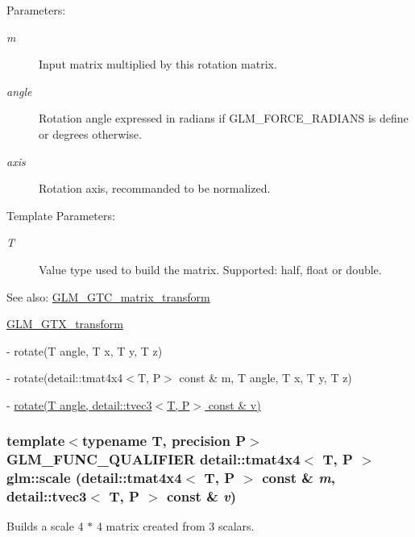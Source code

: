 \begin{Desc}
\item[Parameters:]
\begin{description}
\item[{\em m}]Input matrix multiplied by this rotation matrix. \item[{\em angle}]Rotation angle expressed in radians if GLM\_\-FORCE\_\-RADIANS is define or degrees otherwise. \item[{\em axis}]Rotation axis, recommanded to be normalized. \end{description}
\end{Desc}
\begin{Desc}
\item[Template Parameters:]
\begin{description}
\item[{\em T}]Value type used to build the matrix. Supported: half, float or double. \end{description}
\end{Desc}
\begin{Desc}
\item[See also:]\hyperlink{group__gtc__matrix__transform}{GLM\_\-GTC\_\-matrix\_\-transform} 

\hyperlink{group__gtx__transform}{GLM\_\-GTX\_\-transform} 

- rotate(T angle, T x, T y, T z) 

- rotate(detail::tmat4x4$<$T, P$>$ const \& m, T angle, T x, T y, T z) 

- \hyperlink{group__gtx__transform_g52e753e0ad1cb6ae700855cc9ca921ca}{rotate(T angle, detail::tvec3$<$T, P$>$ const \& v)} \end{Desc}
\hypertarget{group__gtc__matrix__transform_g5e2bf1cdf124863558884751d611aea6}{
\subsubsection[scale]{\setlength{\rightskip}{0pt plus 5cm}template$<$typename T, precision P$>$ GLM\_\-FUNC\_\-QUALIFIER detail::tmat4x4$<$ T, P $>$ glm::scale (detail::tmat4x4$<$ T, P $>$ const \& {\em m}, \/  detail::tvec3$<$ T, P $>$ const \& {\em v})}}
\label{group__gtc__matrix__transform_g5e2bf1cdf124863558884751d611aea6}


Builds a scale 4 $\ast$ 4 matrix created from 3 scalars.

